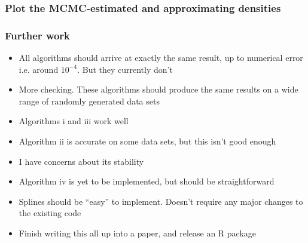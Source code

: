 \documentclass{beamer}
\begin{document}
\begin{frame}
\frametitle{Plot the MCMC-estimated and approximating densities}
\end{frame}

\begin{frame}
\frametitle{Further work}
\begin{itemize}
\item All algorithms should arrive at exactly the same result, up to numerical error i.e. around $10^{-4}$. But they currently don't
\item More checking. These algorithms should produce the same results on
a wide range of randomly generated data sets
\item Algorithms i and iii work well
\item Algorithm ii is accurate on some data sets, but this isn't good enough
\item I have concerns about its stability
\item Algorithm iv is yet to be implemented, but should be straightforward
\item Splines should be ``easy'' to implement. Doesn't require any major changes to the existing code
\item Finish writing this all up into a paper, and release an R package
\end{itemize}
\end{frame}
\end{document}
